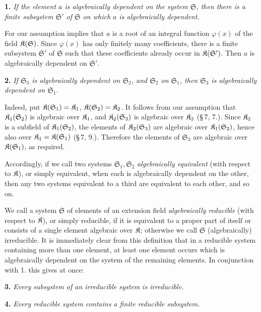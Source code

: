 \textbf{1.} \emph{If the element $a$ is algebraically dependent on the system $\mathfrak S$, then there is a finite subsystem $\mathfrak S'$ of $\mathfrak S$ on which $a$ is algebraically dependent.}

For our assumption implies that $a$ is a root of an integral function $\varphi(x)$ of the field $\mathfrak K(\mathfrak S)$. Since $\varphi(x)$ has only finitely many coefficients, there is a finite subsystem $\mathfrak S'$ of $\mathfrak S$ such that these coefficients already occur in $\mathfrak K(\mathfrak S')$. Then $a$ is algebraically dependent on $\mathfrak S'$.

\textbf{2.} \emph{If $\mathfrak S_3$ is algebraically dependent on $\mathfrak S_2$, and $\mathfrak S_2$ on $\mathfrak S_1$, then $\mathfrak S_3$ is algebraically dependent on $\mathfrak S_1$.}

Indeed, put $\mathfrak K(\mathfrak S_1)=\mathfrak K_1$, $\mathfrak K(\mathfrak S_2)=\mathfrak K_2$. It follows from our assumption that $\mathfrak K_1(\mathfrak S_2)$ is algebraic over $\mathfrak K_1$, and $\mathfrak K_2(\mathfrak S_3)$ is algebraic over $\mathfrak K_2$ (\S\,7, 7.). Since $\mathfrak K_2$ is a subfield of $\mathfrak K_1(\mathfrak S_2)$, the elements of $\mathfrak K_2(\mathfrak S_3)$ are algebraic over $\mathfrak K_1(\mathfrak S_2)$, hence also over $\mathfrak K_1=\mathfrak K(\mathfrak S_1)$ (\S\,7, 9.). Therefore the elements of $\mathfrak S_3$ are algebraic over $\mathfrak K(\mathfrak S_1)$, as required.

Accordingly, if we call two systems $\mathfrak S_1,\mathfrak S_2$ \emph{algebraically equivalent} (with respect to $\mathfrak K$), or simply equivalent, when each is algebraically dependent on the other, then any two systems equivalent to a third are equivalent to each other, and so on.

We call a system $\mathfrak S$ of elements of an extension field \emph{algebraically reducible} (with respect to $\mathfrak K$), or simply reducible, if it is equivalent to a proper part of itself or consists of a single element algebraic over $\mathfrak K$; otherwise we call $\mathfrak S$ (algebraically) irreducible. It is immediately clear from this definition that in a reducible system containing more than one element, at least one element occurs which is algebraically dependent on the system of the remaining elements. In conjunction with 1. this gives at once:

\textbf{3.} \emph{Every subsystem of an irreducible system is irreducible.}

\textbf{4.} \emph{Every reducible system contains a finite reducible subsystem.}

